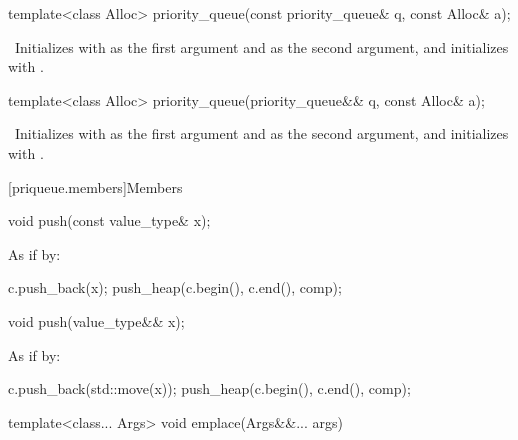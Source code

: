 %
\begin{itemdecl}
template<class Alloc> priority_queue(const priority_queue& q, const Alloc& a);
\end{itemdecl}

\begin{itemdescr}
\pnum
\effects\ Initializes  with  as the first argument and  as
the second argument, and initializes  with .
\end{itemdescr}

%
\begin{itemdecl}
template<class Alloc> priority_queue(priority_queue&& q, const Alloc& a);
\end{itemdecl}

\begin{itemdescr}
\pnum
\effects\ Initializes  with  as the first argument and 
as the second argument, and initializes  with .
\end{itemdescr}

[priqueue.members]{Members}

%
\begin{itemdecl}
void push(const value_type& x);
\end{itemdecl}

\begin{itemdescr}
\pnum
\effects
As if by:
\begin{codeblock}
c.push_back(x);
push_heap(c.begin(), c.end(), comp);
\end{codeblock}
\end{itemdescr}

%
\begin{itemdecl}
void push(value_type&& x);
\end{itemdecl}

\begin{itemdescr}
\pnum
\effects
As if by:
\begin{codeblock}
c.push_back(std::move(x));
push_heap(c.begin(), c.end(), comp);
\end{codeblock}
\end{itemdescr}

%
\begin{itemdecl}
template<class... Args> void emplace(Args&&... args)
\end{itemdecl}


